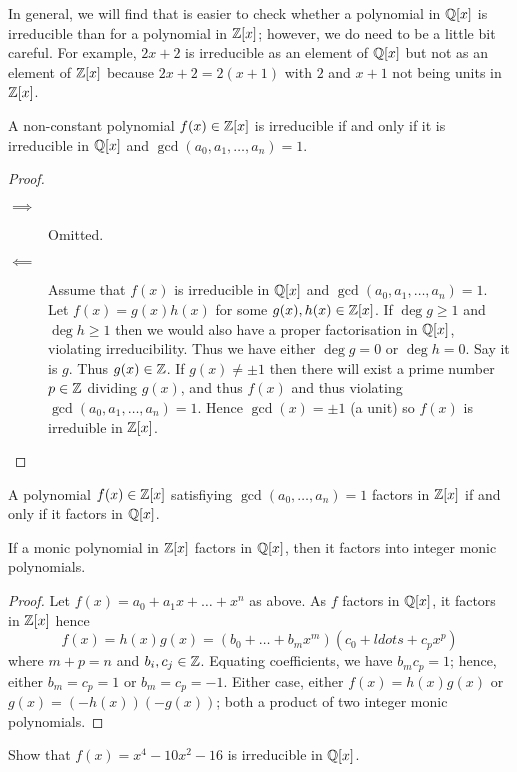 
In general, we will find that is easier to check whether a polynomial in $\mathbb{Q}[x]$ is irreducible than for a polynomial in $\mathbb{Z}[x]$; however, we do need to be a little bit careful. For example, $2x + 2$ is irreducible as an element of $\mathbb{Q}[x]$ but not as an element of $\mathbb{Z}[x]$ because $2x + 2 = 2(x + 1)$ with $2$ and $x+1$ not being units in $\mathbb{Z}[x]$.

\begin{lemma}
    A non-constant polynomial $f(x) \in \mathbb{Z}[x]$ is irreducible if and only if it is irreducible in $\mathbb{Q}[x]$ and $\gcd{(a_0, a_1, \ldots, a_n)} = 1$. 
\end{lemma}

\begin{proof}
    \begin{description}
        \item[$\implies$] Omitted.
        \item[$\impliedby$] Assume that $f(x)$ is irreducible in $\mathbb{Q}[x]$ and $\gcd{(a_0, a_1, \ldots, a_n)} = 1$. 
            Let $f(x) = g(x) h(x)$ for some $g(x), h(x) \in \mathbb{Z}[x]$. 
            If $\deg{g} \geq 1$ and $\deg{h} \geq 1$ then we would also have a proper factorisation in $\mathbb{Q}[x]$, violating irreducibility. 
            Thus we have either $\deg{g} = 0$ or $\deg{h} = 0$. 
            Say it is $g$. 
            Thus $g(x) \in \mathbb{Z}$. 
            If $g(x) \neq \pm 1$ then there will exist a prime number $p \in \mathbb{Z}$ dividing $g(x)$, and thus $f(x)$ and thus violating $\gcd{(a_0, a_1, \ldots, a_n)} = 1$.
            Hence $\gcd{(x)} = \pm 1$ (a unit) so $f(x)$ is irreduible in $\mathbb{Z}[x]$.
    \end{description}
\end{proof}

\begin{corollary}
    A polynomial $f(x) \in \mathbb{Z}[x]$ satisfiying $\gcd{(a_0, \ldots, a_n)} = 1$ factors in $\mathbb{Z}[x]$ if and only if it factors in $\mathbb{Q}[x]$.
\end{corollary}

\begin{lemma}
    If a monic polynomial in $\mathbb{Z}[x]$ factors in $\mathbb{Q}[x]$, then it factors into integer monic polynomials.
\end{lemma}

\begin{proof}
    Let $f(x) = a_0 + a_1x + \ldots + x^n$ as above. 
    As $f$ factors in $\mathbb{Q}[x]$, it factors in $\mathbb{Z}[x]$ hence
    \[ f(x) = h(x) g(x) = (b_0 + \ldots + b_m x^m)(c_0 + ldots + c_p x^p) \] 
    where $m + p = n$ and $b_i, c_j \in \mathbb{Z}$. 
    Equating coefficients, we have $b_m c_p = 1$; hence, either $b_m = c_p = 1$ or $b_m = c_p = -1$.
    Either case, either $f(x) = h(x) g(x)$ or $g(x) = (-h(x))(-g(x))$; both a product of two integer monic polynomials.
\end{proof}

\begin{example}
    Show that $f(x) = x^4 - 10x^2 - 16$ is irreducible in $\mathbb{Q}[x]$.
\end{example}
